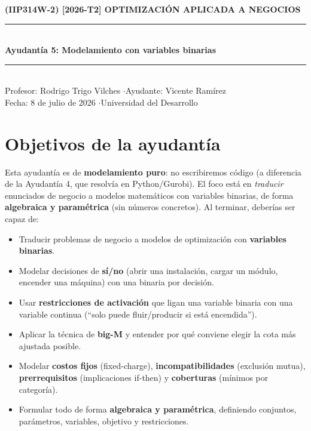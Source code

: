 \documentclass[11pt]{article}
\newif\ifsolucion
\begin{document}
\begin{center}
{\normalsize\textbf{(IIP314W-2) [2026-T2] OPTIMIZACIÓN APLICADA A NEGOCIOS}}\\[0.4em]
\rule{\linewidth}{0.8pt}\\[0.6em]
{\Large\bfseries Ayudantía 5: Modelamiento con variables binarias%
\ifsolucion\ --- Pauta (Solución)\fi}\\[0.8em]
\rule{\linewidth}{0.4pt}\\[0.5em]
{\normalsize
Profesor: Rodrigo Trigo Vilches \quad$\cdot$\quad Ayudante: Vicente Ramírez\\[0.2em]
Fecha: 8 de julio de 2026 \quad$\cdot$\quad Universidad del Desarrollo}
\end{center}

\vspace{0.6em}

\section*{Objetivos de la ayudantía}

Esta ayudantía es de \textbf{modelamiento puro}: no escribiremos código (a diferencia de la Ayudantía 4, que resolvía en Python/Gurobi). El foco está en \emph{traducir} enunciados de negocio a modelos matemáticos con variables binarias, de forma \textbf{algebraica y paramétrica} (sin números concretos). Al terminar, deberías ser capaz de:

\begin{itemize}[leftmargin=1.6em,itemsep=0.2em]
    \item Traducir problemas de negocio a modelos de optimización con \textbf{variables binarias}.
    \item Modelar decisiones de \textbf{sí/no} (abrir una instalación, cargar un módulo, encender una máquina) con una binaria por decisión.
    \item Usar \textbf{restricciones de activación} que ligan una variable binaria con una variable continua (``solo puede fluir/producir si está encendida'').
    \item Aplicar la técnica de \textbf{big-M} y entender por qué conviene elegir la cota más ajustada posible.
    \item Modelar \textbf{costos fijos} (fixed-charge), \textbf{incompatibilidades} (exclusión mutua), \textbf{prerrequisitos} (implicaciones if-then) y \textbf{coberturas} (mínimos por categoría).
    \item Formular todo de forma \textbf{algebraica y paramétrica}, definiendo conjuntos, parámetros, variables, objetivo y restricciones.
\end{itemize}
\end{document}

